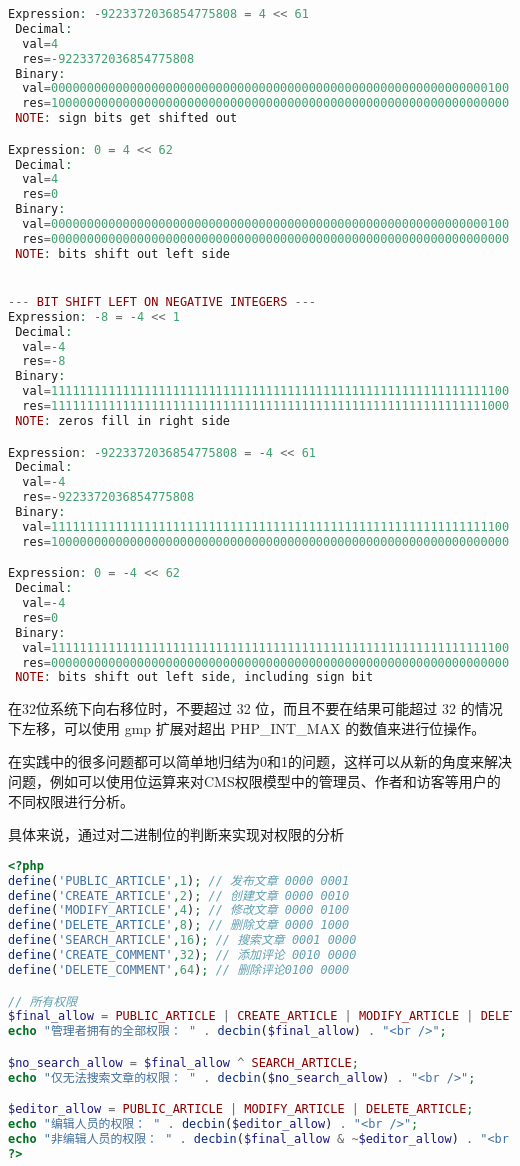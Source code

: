 \begin{lstlisting}[language=PHP]
Expression: -9223372036854775808 = 4 << 61
 Decimal:
  val=4
  res=-9223372036854775808
 Binary:
  val=0000000000000000000000000000000000000000000000000000000000000100
  res=1000000000000000000000000000000000000000000000000000000000000000
 NOTE: sign bits get shifted out

Expression: 0 = 4 << 62
 Decimal:
  val=4
  res=0
 Binary:
  val=0000000000000000000000000000000000000000000000000000000000000100
  res=0000000000000000000000000000000000000000000000000000000000000000
 NOTE: bits shift out left side


--- BIT SHIFT LEFT ON NEGATIVE INTEGERS ---
Expression: -8 = -4 << 1
 Decimal:
  val=-4
  res=-8
 Binary:
  val=1111111111111111111111111111111111111111111111111111111111111100
  res=1111111111111111111111111111111111111111111111111111111111111000
 NOTE: zeros fill in right side

Expression: -9223372036854775808 = -4 << 61
 Decimal:
  val=-4
  res=-9223372036854775808
 Binary:
  val=1111111111111111111111111111111111111111111111111111111111111100
  res=1000000000000000000000000000000000000000000000000000000000000000

Expression: 0 = -4 << 62
 Decimal:
  val=-4
  res=0
 Binary:
  val=1111111111111111111111111111111111111111111111111111111111111100
  res=0000000000000000000000000000000000000000000000000000000000000000
 NOTE: bits shift out left side, including sign bit
\end{lstlisting}


在32位系统下向右移位时，不要超过 32 位，而且不要在结果可能超过 32 的情况下左移，可以使用 gmp 扩展对超出 PHP\_INT\_MAX 的数值来进行位操作。

在实践中的很多问题都可以简单地归结为0和1的问题，这样可以从新的角度来解决问题，例如可以使用位运算来对CMS权限模型中的管理员、作者和访客等用户的不同权限进行分析。

具体来说，通过对二进制位的判断来实现对权限的分析

\begin{lstlisting}[language=PHP]
<?php
define('PUBLIC_ARTICLE',1); // 发布文章 0000 0001
define('CREATE_ARTICLE',2); // 创建文章 0000 0010
define('MODIFY_ARTICLE',4); // 修改文章 0000 0100
define('DELETE_ARTICLE',8); // 删除文章 0000 1000
define('SEARCH_ARTICLE',16); // 搜索文章 0001 0000
define('CREATE_COMMENT',32); // 添加评论 0010 0000
define('DELETE_COMMENT',64); // 删除评论0100 0000

// 所有权限
$final_allow = PUBLIC_ARTICLE | CREATE_ARTICLE | MODIFY_ARTICLE | DELETE_ARTICLE | SEARCH_ARTICLE | CREATE_COMMENT | DELETE_COMMENT;
echo "管理者拥有的全部权限： " . decbin($final_allow) . "<br />";

$no_search_allow = $final_allow ^ SEARCH_ARTICLE;
echo "仅无法搜索文章的权限： " . decbin($no_search_allow) . "<br />";

$editor_allow = PUBLIC_ARTICLE | MODIFY_ARTICLE | DELETE_ARTICLE;
echo "编辑人员的权限： " . decbin($editor_allow) . "<br />";
echo "非编辑人员的权限： " . decbin($final_allow & ~$editor_allow) . "<br />";
?>
\end{lstlisting}



